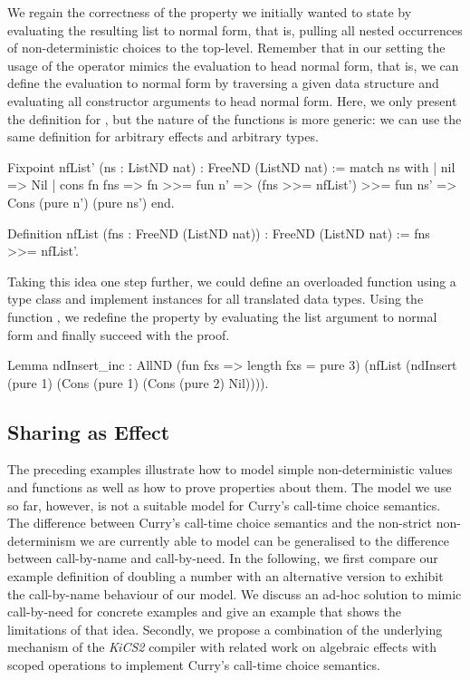 We regain the correctness of the property we initially wanted to state by evaluating the resulting list to normal form, that is, pulling all nested occurrences of non\--deterministic choices to the top\--level.
Remember that in our setting the usage of the operator \cinl{>>=} mimics the evaluation to head normal form, that is, we can define the evaluation to normal form by traversing a given data structure and evaluating all constructor arguments to head normal form.
Here, we only present the definition for , but the nature of the functions is more generic: we can use the same definition for arbitrary effects and arbitrary types.

\begin{coqcode}
Fixpoint nfList' (ns : ListND nat) : FreeND (ListND nat) :=
 match ns with
 | nil         => Nil
 | cons fn fns => fn >>= fun n' =>
                  (fns >>= nfList') >>= fun ns' =>
                  Cons (pure n') (pure ns')
 end.

Definition nfList (fns : FreeND (ListND nat)) : FreeND (ListND nat) :=
 fns >>= nfList'.
\end{coqcode}

Taking this idea one step further, we could define an overloaded function  using a type class and implement instances for all translated data types.
Using the function , we redefine the property by evaluating the list argument to normal form and finally succeed with the proof.

\begin{coqcode}
Lemma ndInsert_inc :
  AllND (fun fxs => length fxs = pure 3)
        (nfList (ndInsert (pure 1) (Cons (pure 1) (Cons (pure 2) Nil)))).
\end{coqcode}



\subsection{Sharing as Effect}
\label{subsec:sharingEffect}

The preceding examples illustrate how to model simple non\--deterministic values and functions as well as how to prove properties about them.
The model we use so far, however, is not a suitable model for Curry's call\--time choice semantics.
The difference between Curry's call\--time choice semantics and the non\--strict non\--determinism we are currently able to model can be generalised to the difference between call\--by\--name and call\--by\--need.
In the following, we first compare our example definition of doubling a number with an alternative version to exhibit the call\--by\--name behaviour of our model.
We discuss an ad\--hoc solution to mimic call\--by\--need for concrete examples and give an example that shows the limitations of that idea.
Secondly, we propose a combination of the underlying mechanism of the \emph{KiCS2} compiler with related work on algebraic effects with scoped operations to implement Curry's call\--time choice semantics.

